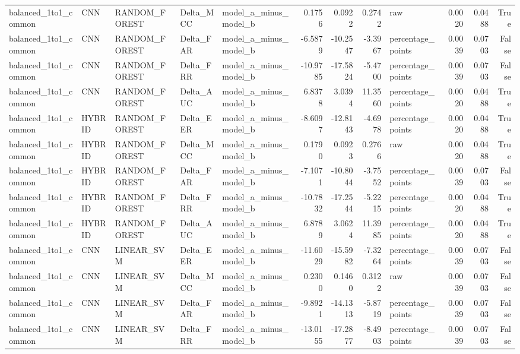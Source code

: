 \begin{table}
\begin{tabular}{lllllrrrlrrr}
balanced\_1to1\_common & CNN & RANDOM\_FOREST & Delta\_MCC & model\_a\_minus\_model\_b & 0.1756 & 0.0922 & 0.2742 & raw & 0.0020 & 0.0488 & True \\
balanced\_1to1\_common & CNN & RANDOM\_FOREST & Delta\_FAR & model\_a\_minus\_model\_b & -6.5879 & -10.2547 & -3.3967 & percentage\_points & 0.0039 & 0.0703 & False \\
balanced\_1to1\_common & CNN & RANDOM\_FOREST & Delta\_FRR & model\_a\_minus\_model\_b & -10.9785 & -17.5824 & -5.4700 & percentage\_points & 0.0039 & 0.0703 & False \\
balanced\_1to1\_common & CNN & RANDOM\_FOREST & Delta\_AUC & model\_a\_minus\_model\_b & 6.8378 & 3.0394 & 11.3560 & percentage\_points & 0.0020 & 0.0488 & True \\
balanced\_1to1\_common & HYBRID & RANDOM\_FOREST & Delta\_EER & model\_a\_minus\_model\_b & -8.6097 & -12.8143 & -4.6978 & percentage\_points & 0.0020 & 0.0488 & True \\
balanced\_1to1\_common & HYBRID & RANDOM\_FOREST & Delta\_MCC & model\_a\_minus\_model\_b & 0.1790 & 0.0923 & 0.2766 & raw & 0.0020 & 0.0488 & True \\
balanced\_1to1\_common & HYBRID & RANDOM\_FOREST & Delta\_FAR & model\_a\_minus\_model\_b & -7.1071 & -10.8044 & -3.7552 & percentage\_points & 0.0039 & 0.0703 & False \\
balanced\_1to1\_common & HYBRID & RANDOM\_FOREST & Delta\_FRR & model\_a\_minus\_model\_b & -10.7832 & -17.2544 & -5.2215 & percentage\_points & 0.0020 & 0.0488 & True \\
balanced\_1to1\_common & HYBRID & RANDOM\_FOREST & Delta\_AUC & model\_a\_minus\_model\_b & 6.8789 & 3.0624 & 11.3985 & percentage\_points & 0.0020 & 0.0488 & True \\
balanced\_1to1\_common & CNN & LINEAR\_SVM & Delta\_EER & model\_a\_minus\_model\_b & -11.6029 & -15.5982 & -7.3264 & percentage\_points & 0.0039 & 0.0703 & False \\
balanced\_1to1\_common & CNN & LINEAR\_SVM & Delta\_MCC & model\_a\_minus\_model\_b & 0.2300 & 0.1460 & 0.3122 & raw & 0.0039 & 0.0703 & False \\
balanced\_1to1\_common & CNN & LINEAR\_SVM & Delta\_FAR & model\_a\_minus\_model\_b & -9.8921 & -14.1313 & -5.8719 & percentage\_points & 0.0039 & 0.0703 & False \\
balanced\_1to1\_common & CNN & LINEAR\_SVM & Delta\_FRR & model\_a\_minus\_model\_b & -13.0155 & -17.2877 & -8.4903 & percentage\_points & 0.0039 & 0.0703 & False \\

\end{tabular}
\end{table}
